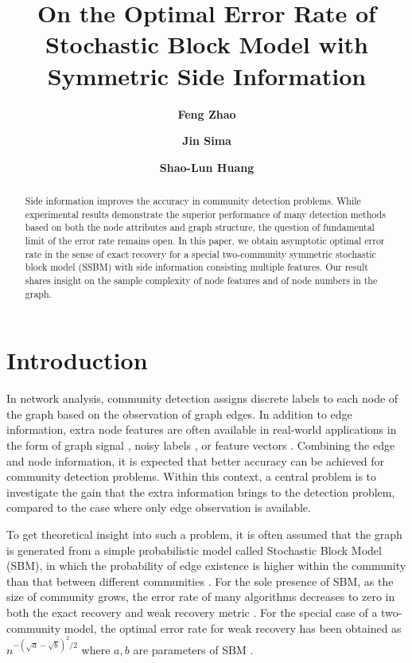 \documentclass[conference]{IEEEtran}
\title{On the Optimal Error Rate of Stochastic Block Model with Symmetric Side Information}
\author[1]{\textbf{Feng Zhao}}
\author[2]{\textbf{Jin Sima}}
\author[3]{\textbf{Shao-Lun Huang}}
\affil[1]{\normalsize{Department of Electronic Engineering,
		Tsinghua University, 
		Beijing, China 100084}}
\affil[2]{\normalsize{Department of Electrical Engineering, California Institute of Technology, Pasadena 91125, CA, USA}}
\affil[3]{\normalsize{DSIT Research Center,
		Tsinghua-Berkeley Shenzhen Institute,
		Shenzhen, China 518055}}
\begin{document}
\maketitle
\begin{abstract}
    Side information improves the accuracy in community detection problems.
    While experimental results demonstrate the superior performance of many detection methods
    based on both the node attributes and graph structure, the question of fundamental limit of the error rate remains open.
    In this paper, we obtain asymptotic optimal error rate in the sense of 
    exact recovery for a special two-community symmetric stochastic block model (SSBM) with side information consisting multiple features.
    Our result shares insight on the sample complexity of node features and of node numbers in the graph.
\end{abstract}
\section{Introduction}
In network analysis, community detection assigns discrete labels to each node of the graph based on the observation of graph edges.
In addition to edge information, extra node features are often available in real-world applications in the form of graph signal \cite{dong2020graph},
noisy labels \cite{mossel2016local}, or
feature vectors \cite{zhang2016community}. Combining the edge and node information, it is expected that better
accuracy can be achieved for community detection problems. Within this context, a central problem 
is to investigate the gain that the extra information brings to the detection problem, compared to the case where only edge observation is available.

To get theoretical insight into such a problem, it is often assumed that the graph is generated from a simple probabilistic model called Stochastic Block Model (SBM), in which the probability of edge existence is higher within the community than that between different communities \cite{holland1983stochastic}. For the sole presence of SBM, as the size of community grows, the error rate of many algorithms decreases to zero in both the exact recovery and weak recovery metric \cite{yun2014accurate,fei2019achieving}. For the special case of a two-community model,
the optimal error rate for weak recovery has been obtained as $n^{-(\sqrt{a} - \sqrt{b})^2/2}$ where $a,b$ are parameters of SBM \cite{zhang2016}.
\end{document}
